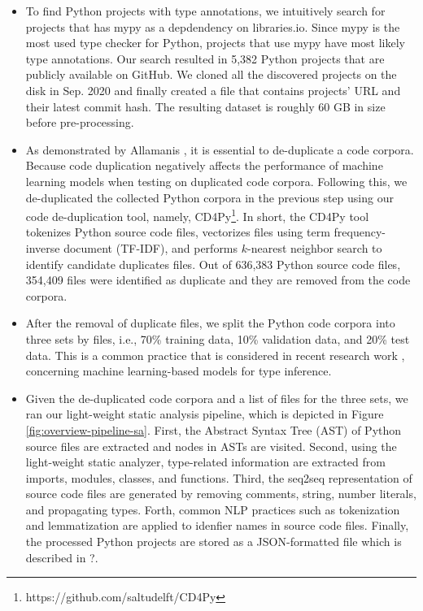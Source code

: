 \documentclass[10pt, conference]{IEEEtran}
\begin{document}
\begin{itemize}
	\item To find Python projects with type annotations, we intuitively search for projects that has mypy as a depdendency on libraries.io. Since mypy is the most used type checker for Python, projects that use mypy have most likely type annotations. Our search resulted in 5,382 Python projects that are publicly available on GitHub. We cloned all the discovered projects on the disk in Sep. 2020 and finally created a file that contains projects' URL and their latest commit hash. The resulting dataset is roughly 60 GB in size before pre-processing.
	\item As demonstrated by Allamanis \cite{allamanis2019adverse}, it is essential to de-duplicate a code corpora. Because code duplication negatively affects the performance of machine learning models when testing on duplicated code corpora. Following this, we de-duplicated the collected Python corpora in the previous step using our code de-duplication tool, namely, CD4Py\footnote{https://github.com/saltudelft/CD4Py}. In short, the CD4Py tool tokenizes Python source code files, vectorizes files using term frequency-inverse document (TF-IDF), and performs $k$-nearest neighbor search to identify candidate duplicates files. Out of 636,383 Python source code files, 354,409 files were identified as duplicate and they are removed from the code corpora.
	\item After the removal of duplicate files, we split the Python code corpora into three sets by files, i.e., 70\% training data, 10\% validation data, and 20\% test data. This is a common practice that is considered in recent research work \cite{pradel2019typewriter, allamanis2020typilus}, concerning machine learning-based models for type inference.
	\item Given the de-duplicated code corpora and a list of files for the three sets, we ran our light-weight static analysis pipeline, which is depicted in Figure \ref{fig:overview-pipeline-sa}. First, the Abstract Syntax Tree (AST) of Python source files are extracted and nodes in ASTs are visited. Second, using the light-weight static analyzer, type-related information are extracted from imports, modules, classes, and functions. Third, the seq2seq representation of source code files \cite{hellendoorn2018deep} are generated by removing comments, string, number literals, and propagating types. Forth, common NLP practices such as tokenization and lemmatization are applied to idenfier names in source code files. Finally, the processed Python projects are stored as a JSON-formatted file which is described in ?. 
\end{itemize}
\end{document}
